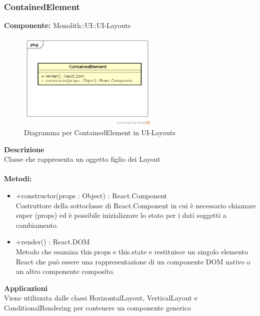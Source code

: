 \subsubsection{ContainedElement}
\textbf{Componente:}  Monolith::UI::UI-Layouts\\
   \FloatBarrier
   \begin{figure}[ht]
   \centering
   \includegraphics[width=0.6\textwidth]{img/single-ContainedElement}
   \caption{{Diagramma per ContainedElement in UI-Layouts}}
\end{figure}
\FloatBarrier
\textbf{Descrizione}\\
Classe che rappresenta un oggetto figlio dei Layout \\\\
\textbf{Metodi:} \begin{itemize}\item +constructor(props : Object) : React.Component \\Costruttore della sottoclasse di React.Component in cui è necessario chiamare super (props) ed è possibile inizializzare lo stato per i dati soggetti a cambiamento. \item +render() : React.DOM \\Metodo che esamina this.props e this.state e restituisce un singolo elemento React che può essere una rappresentazione di un componente DOM nativo o un altro componente composito.\end{itemize} 


\textbf{Applicazioni}\\
Viene utilizzata dalle classi HorizontalLayout, VerticalLayout e ConditionalRendering per contenere un componente generico 


\clearpage

